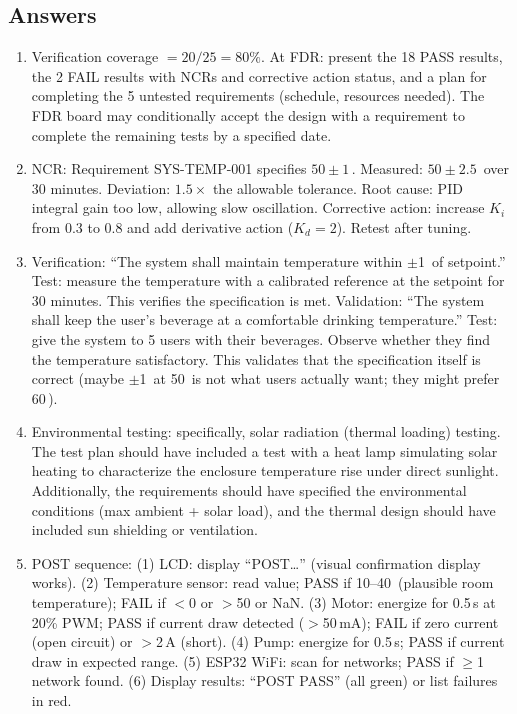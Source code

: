 \subsection{Answers}
\begin{enumerate}[leftmargin=1.5em]
\item Verification coverage $= 20/25 = 80\%$. At FDR: present the 18 PASS results, the 2 FAIL results with NCRs and corrective action status, and a plan for completing the 5 untested requirements (schedule, resources needed). The FDR board may conditionally accept the design with a requirement to complete the remaining tests by a specified date.
\item NCR: Requirement SYS-TEMP-001 specifies $50 \pm 1$\,\degC{}. Measured: $50 \pm 2.5$\,\degC{} over 30 minutes. Deviation: $1.5\times$ the allowable tolerance. Root cause: PID integral gain too low, allowing slow oscillation. Corrective action: increase $K_i$ from 0.3 to 0.8 and add derivative action ($K_d = 2$). Retest after tuning.
\item Verification: ``The system shall maintain temperature within $\pm$1\,\degC{} of setpoint.'' Test: measure the temperature with a calibrated reference at the setpoint for 30 minutes. This verifies the specification is met. Validation: ``The system shall keep the user's beverage at a comfortable drinking temperature.'' Test: give the system to 5 users with their beverages. Observe whether they find the temperature satisfactory. This validates that the specification itself is correct (maybe $\pm$1\,\degC{} at 50\,\degC{} is not what users actually want; they might prefer 60\,\degC{}).
\item Environmental testing: specifically, solar radiation (thermal loading) testing. The test plan should have included a test with a heat lamp simulating solar heating to characterize the enclosure temperature rise under direct sunlight. Additionally, the requirements should have specified the environmental conditions (max ambient + solar load), and the thermal design should have included sun shielding or ventilation.
\item POST sequence: (1) LCD: display ``POST\ldots'' (visual confirmation display works). (2) Temperature sensor: read value; PASS if 10--40\,\degC{} (plausible room temperature); FAIL if $<$0 or $>$50 or NaN. (3) Motor: energize for 0.5\,s at 20\% PWM; PASS if current draw detected ($>$50\,mA); FAIL if zero current (open circuit) or $>$2\,A (short). (4) Pump: energize for 0.5\,s; PASS if current draw in expected range. (5) ESP32 WiFi: scan for networks; PASS if $\geq$1 network found. (6) Display results: ``POST PASS'' (all green) or list failures in red.
\end{enumerate}
